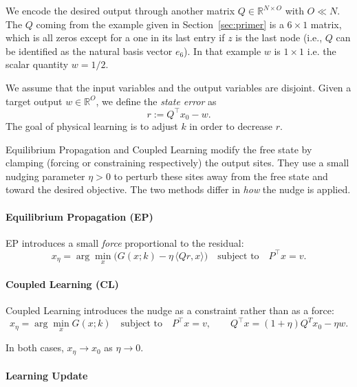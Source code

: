\documentclass{siamart}
\begin{document}
We encode the desired output through another matrix $Q \in \mathbb{R}^{N \times O}$ with $O \ll N$. The $Q$ coming from the example given in Section~\ref{sec:primer} is a $6 \times 1$ matrix, which is all zeros except for a one in its last entry if $z$ is the last node (i.e.\@, $Q$ can be identified as the natural basis vector $e_6$). In that example $w$ is $1 \times 1$ i.e. the scalar quantity $w=1/2.$

We assume that the input variables and the output variables are disjoint. Given a target output $w \in \mathbb{R}^O$, we define the \emph{state error} as
\[
    r := Q^\top x_0 - w.
\]
The goal of physical learning is to adjust $k$ in order to decrease $r$.

Equilibrium Propagation and Coupled Learning modify the free state by clamping (forcing or constraining respectively) the output sites. They use a small nudging parameter $\eta > 0$ to perturb these sites away from the free state and toward the desired objective. The two methods differ in \emph{how} the nudge is applied.

\paragraph{Equilibrium Propagation (EP)}
EP introduces a small \textit{force} proportional to the residual:
\begin{equation}
    x_\eta 
    = \arg\min_{x} 
    \big(
        G(x;k) - \eta\, \langle Qr, x\rangle
    \big)
    \quad\text{subject to}\quad
    P^\top x = v.
    \label{eq:EP}
\end{equation}

\paragraph{Coupled Learning (CL)}
Coupled Learning introduces the nudge as a constraint rather than as a force:
\begin{equation}
    x_\eta
    = \arg\min_{x} G(x;k)
    \quad\text{subject to}\quad
    P^\top x = v, 
    \qquad 
    Q^\top x =(1+\eta)Q^Tx_0 -\eta w .
    \label{eq:CL}
\end{equation}

In both cases, $x_\eta \to x_0$ as $\eta \to 0$.

\paragraph{Learning Update}
\end{document}
